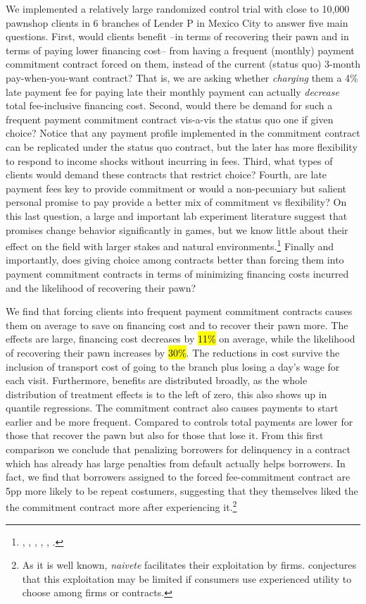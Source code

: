 \documentclass[11pt]{article}
\begin{document}
We implemented a relatively large randomized control trial with close to 10,000 pawnshop clients in 6 branches of Lender P in Mexico City to answer five main questions. First, would clients benefit --in terms of recovering their pawn and in terms of paying lower financing cost-- from having a frequent (monthly) payment commitment contract forced on them, instead of the current (status quo) 3-month pay-when-you-want contract? That is, we are asking whether \textit{charging} them a 4\% late payment fee for paying late their monthly payment can actually \textit{decrease} total fee-inclusive financing cost. Second, would there be demand for such a frequent payment commitment contract vis-a-vis the status quo one if given choice? Notice that any payment profile implemented in the commitment contract can be replicated under the status quo contract, but the later has more flexibility to respond to income shocks without incurring in fees. Third, what types of clients would demand these contracts that restrict choice? Fourth, are late payment fees key to provide commitment or would a non-pecuniary but salient personal promise to pay provide a better mix of commitment vs flexibility? On this last question, a large and important lab experiment literature suggest that promises change behavior significantly in games, but we know little about their effect on the field with larger stakes and natural environments.\footnote{\cite{PromisesPartnerships}, \cite{Vanberg}, \cite{Belot2010}, \cite{WhyDoPromises}, \cite{FurtherPromises}, \cite{Ismayilov2017}.} Finally and importantly, does giving choice among contracts better than forcing them into payment commitment contracts in terms of minimizing financing costs incurred and the likelihood of recovering their pawn?

We find that forcing clients into frequent payment commitment contracts causes them on average to save on financing cost and to recover their pawn more. The effects are large, financing cost decreases by \hl{11\%} on average, while the likelihood of recovering their pawn increases by \hl{30\%}. The reductions in cost survive the inclusion of transport cost of going to the branch plus losing a day's wage for each visit. Furthermore, benefits are distributed broadly, as the whole distribution of treatment effects is to the left of zero, this also shows up in quantile regressions. The commitment contract also causes payments to start earlier and be more frequent. Compared to controls total payments are lower for those that recover the pawn but also for those that lose it. 
From this first comparison we conclude that penalizing borrowers for delinquency in a contract which has already has large penalties from default actually helps borrowers. In fact, we find that borrowers assigned to the forced fee-commitment contract are 5pp more likely to be repeat costumers, suggesting that they themselves liked the the commitment contract more after experiencing it.\footnote{As it is well known, \textit{naivete} facilitates their exploitation by firms. \cite{Laibson2018} conjectures that this exploitation may be limited if consumers use experienced utility to choose among firms or contracts.}
\end{document}

